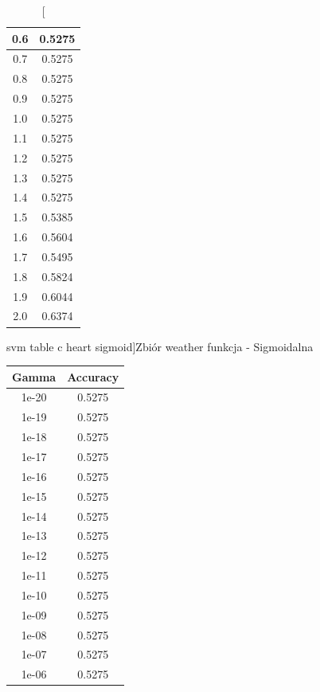 \documentclass{classrep}
\begin{document}
{{\begin{table}[!htbp]
\begin{minipage}{.3\textwidth}
\begin{tabular}{|c|c|}
			0.6 & 0.5275 \\ \hline
			0.7 & 0.5275 \\ \hline
			0.8 & 0.5275 \\ \hline
			0.9 & 0.5275 \\ \hline
			1.0 & 0.5275 \\ \hline
			1.1 & 0.5275 \\ \hline
			1.2 & 0.5275 \\ \hline
			1.3 & 0.5275 \\ \hline
			1.4 & 0.5275 \\ \hline
			1.5 & 0.5385 \\ \hline
			1.6 & 0.5604 \\ \hline
			1.7 & 0.5495 \\ \hline
			1.8 & 0.5824 \\ \hline
			1.9 & 0.6044 \\ \hline
			2.0 & 0.6374 \\ \hline
        \end{tabular}
        \caption
        [svm table c heart sigmoid]{Zbiór weather funkcja - Sigmoidalna}
        \label{svm_table_c_heart_sigmoid}
    \end{minipage}
\end{table}
\FloatBarrier
\begin{table}[!htbp]
    \begin{minipage}{.35\textwidth}
        \centering
        \begin{tabular}{|c|c|}
            \hline
			Gamma & Accuracy \\ \hline
			1e-20 & 0.5275 \\ \hline
1e-19 & 0.5275 \\ \hline
1e-18 & 0.5275 \\ \hline
1e-17 & 0.5275 \\ \hline
1e-16 & 0.5275 \\ \hline
1e-15 & 0.5275 \\ \hline
1e-14 & 0.5275 \\ \hline
1e-13 & 0.5275 \\ \hline
1e-12 & 0.5275 \\ \hline
1e-11 & 0.5275 \\ \hline
1e-10 & 0.5275 \\ \hline
1e-09 & 0.5275 \\ \hline
1e-08 & 0.5275 \\ \hline
1e-07 & 0.5275 \\ \hline
1e-06 & 0.5275 \\ \hline

\end{tabular}
\end{minipage}
\end{table}}}
\end{document}

